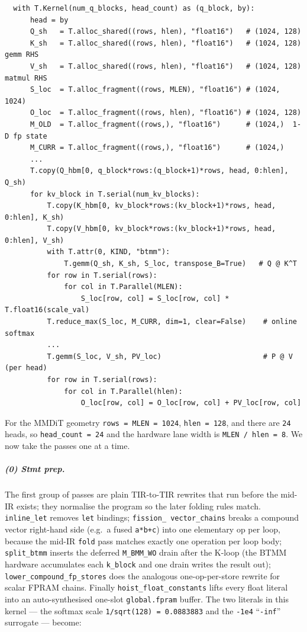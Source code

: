 \documentclass[
  10pt,
]{article}
\begin{document}
\begin{verbatim}
  with T.Kernel(num_q_blocks, head_count) as (q_block, by):
      head = by
      Q_sh   = T.alloc_shared((rows, hlen), "float16")   # (1024, 128)
      K_sh   = T.alloc_shared((rows, hlen), "float16")   # (1024, 128)  gemm RHS
      V_sh   = T.alloc_shared((rows, hlen), "float16")   # (1024, 128)  matmul RHS
      S_loc  = T.alloc_fragment((rows, MLEN), "float16") # (1024, 1024)
      O_loc  = T.alloc_fragment((rows, hlen), "float16") # (1024, 128)
      M_OLD  = T.alloc_fragment((rows,), "float16")      # (1024,)  1-D fp state
      M_CURR = T.alloc_fragment((rows,), "float16")      # (1024,)
      ...
      T.copy(Q_hbm[0, q_block*rows:(q_block+1)*rows, head, 0:hlen], Q_sh)
      for kv_block in T.serial(num_kv_blocks):
          T.copy(K_hbm[0, kv_block*rows:(kv_block+1)*rows, head, 0:hlen], K_sh)
          T.copy(V_hbm[0, kv_block*rows:(kv_block+1)*rows, head, 0:hlen], V_sh)
          with T.attr(0, KIND, "btmm"):
              T.gemm(Q_sh, K_sh, S_loc, transpose_B=True)   # Q @ K^T
          for row in T.serial(rows):
              for col in T.Parallel(MLEN):
                  S_loc[row, col] = S_loc[row, col] * T.float16(scale_val)
          T.reduce_max(S_loc, M_CURR, dim=1, clear=False)    # online softmax
          ...
          T.gemm(S_loc, V_sh, PV_loc)                        # P @ V (per head)
          for row in T.serial(rows):
              for col in T.Parallel(hlen):
                  O_loc[row, col] = O_loc[row, col] + PV_loc[row, col]
\end{verbatim}

For the MMDiT geometry \texttt{rows = MLEN = 1024}, \texttt{hlen = 128},
and there are \texttt{24} heads, so \texttt{head\_count = 24} and the
hardware lane width is \texttt{MLEN / hlen = 8}. We now take the passes
one at a time.

\subparagraph{(0) Stmt prep.}\label{fa-stmt-prep} The first group of
passes are plain TIR-to-TIR rewrites that run before the mid-IR exists;
they normalise the program so the later folding rules match.
\texttt{inline\_let} removes \texttt{let} bindings; \texttt{fission\_%
vector\_chains} breaks a compound vector right-hand side (e.g.\ a fused
\texttt{a*b+c}) into one elementary op per loop, because the mid-IR
\texttt{fold} pass matches exactly one operation per loop body;
\texttt{split\_btmm} inserts the deferred \texttt{M\_BMM\_WO} drain after
the K-loop (the BTMM hardware accumulates each \texttt{k\_block} and one
drain writes the result out); \texttt{lower\_compound\_fp\_stores} does
the analogous one-op-per-store rewrite for scalar FPRAM chains. Finally
\texttt{hoist\_float\_constants} lifts every float literal into an
auto-synthesised one-slot \texttt{global.fpram} buffer. The two literals
in this kernel --- the softmax scale \texttt{1/sqrt(128) = 0.0883883} and
the \texttt{-1e4} ``\texttt{-inf}'' surrogate --- become:
\end{document}
